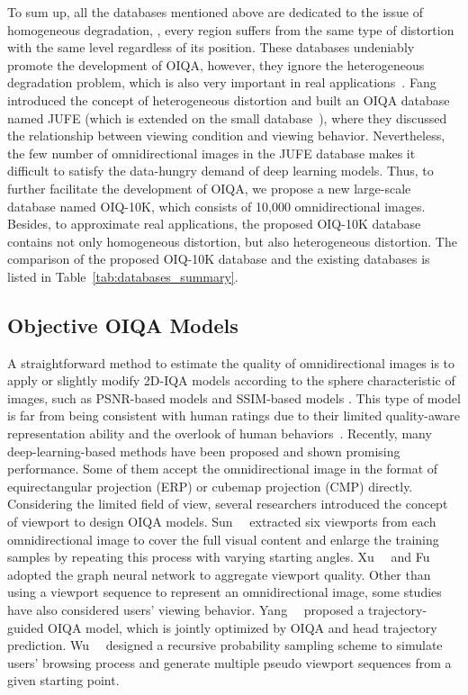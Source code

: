 To sum up, all the databases mentioned above are dedicated to the issue of homogeneous degradation, \ie, every region suffers from the same type of distortion with the same level regardless of its position. These databases undeniably promote the development of OIQA, however, they ignore the heterogeneous degradation problem, which is also very important in real applications~\cite{yan2022subjective}. Fang~\et~\cite{fang2022perceptual} introduced the concept of heterogeneous distortion and built an OIQA database named JUFE (which is extended on the small database~\cite{sui2021perceptual}), where they discussed the relationship between viewing condition and viewing behavior. Nevertheless, the few number of omnidirectional images in the JUFE database makes it difficult to satisfy the data-hungry demand of deep learning models. Thus, to further facilitate the development of OIQA, we propose a new large-scale database named OIQ-10K, which consists of 10,000 omnidirectional images. Besides, to approximate real applications, the proposed OIQ-10K database contains not only homogeneous distortion, but also heterogeneous distortion. The comparison of the proposed OIQ-10K database and the existing databases is listed in Table~\ref{tab:databases_summary}.


\subsection{Objective OIQA Models}
\label{subsec:oiqa_method}

A straightforward method to estimate the quality of omnidirectional images is to apply or slightly modify 2D-IQA models according to the sphere characteristic of images, such as PSNR-based models \cite{yu2015framework,sun2017weighted,zakharchenko2016quality} and SSIM-based models \cite{zhou2018weighted}. This type of model is far from being consistent with human ratings due to their limited quality-aware representation ability and the overlook of human behaviors~\cite{fang2022perceptual, wu2023assessor360}. Recently, many deep-learning-based methods have been proposed and shown promising performance. Some of them accept the omnidirectional image in the format of equirectangular projection (ERP) or cubemap projection (CMP) \cite{kim2019deep,chai2021monocular} directly. Considering the limited field of view, several researchers introduced the concept of viewport to design OIQA models. Sun~\et~\cite{sun2019mc360iqa} extracted six viewports from each omnidirectional image to cover the full visual content and enlarge the training samples by repeating this process with varying starting angles. Xu~\et~\cite{xu2020blind} and Fu~\et~\cite{fu2022adaptive} adopted the graph neural network to aggregate viewport quality. Other than using a viewport sequence to represent an omnidirectional image, some studies have also considered users' viewing behavior. Yang~\et~\cite{yang2022tvformer} proposed a trajectory-guided OIQA model, which is jointly optimized by OIQA and head trajectory prediction. Wu~\et~\cite{wu2023assessor360} designed a recursive probability sampling scheme to simulate users' browsing process and generate multiple pseudo viewport sequences from a given starting point.

